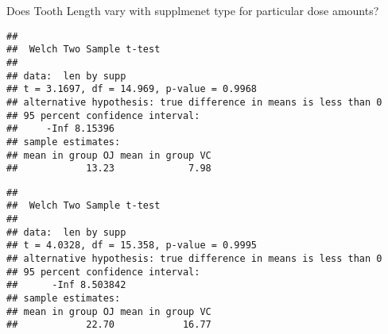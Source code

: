 \documentclass[
]{article}
\newenvironment{Shaded}{\begin{snugshade}}{\end{snugshade}}
\newcommand{\AttributeTok}[1]{\textcolor[rgb]{0.77,0.63,0.00}{#1}}
\newcommand{\CommentTok}[1]{\textcolor[rgb]{0.56,0.35,0.01}{\textit{#1}}}
\newcommand{\ConstantTok}[1]{\textcolor[rgb]{0.00,0.00,0.00}{#1}}
\newcommand{\FloatTok}[1]{\textcolor[rgb]{0.00,0.00,0.81}{#1}}
\newcommand{\FunctionTok}[1]{\textcolor[rgb]{0.00,0.00,0.00}{#1}}
\newcommand{\NormalTok}[1]{#1}
\newcommand{\OtherTok}[1]{\textcolor[rgb]{0.56,0.35,0.01}{#1}}
\newcommand{\SpecialCharTok}[1]{\textcolor[rgb]{0.00,0.00,0.00}{#1}}
\newcommand{\StringTok}[1]{\textcolor[rgb]{0.31,0.60,0.02}{#1}}
\begin{document}
Does Tooth Length vary with supplmenet type for particular dose amounts?

\begin{Shaded}
\end{Shaded}

\begin{verbatim}
## 
##  Welch Two Sample t-test
## 
## data:  len by supp
## t = 3.1697, df = 14.969, p-value = 0.9968
## alternative hypothesis: true difference in means is less than 0
## 95 percent confidence interval:
##     -Inf 8.15396
## sample estimates:
## mean in group OJ mean in group VC 
##            13.23             7.98
\end{verbatim}

\begin{Shaded}
\end{Shaded}

\begin{verbatim}
## 
##  Welch Two Sample t-test
## 
## data:  len by supp
## t = 4.0328, df = 15.358, p-value = 0.9995
## alternative hypothesis: true difference in means is less than 0
## 95 percent confidence interval:
##      -Inf 8.503842
## sample estimates:
## mean in group OJ mean in group VC 
##            22.70            16.77
\end{verbatim}
\end{document}
